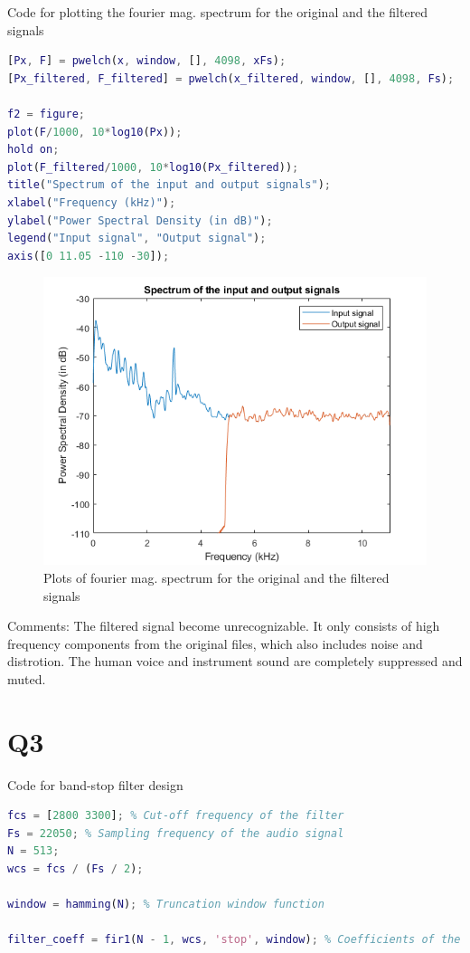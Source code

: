 \documentclass{article}
\begin{document}
Code for plotting the fourier mag. spectrum for the original and the filtered signals
\begin{lstlisting}[language=Matlab]
% Power Spectral Density of the input signal and output signal
[Px, F] = pwelch(x, window, [], 4098, xFs);
[Px_filtered, F_filtered] = pwelch(x_filtered, window, [], 4098, Fs);

f2 = figure;
plot(F/1000, 10*log10(Px));
hold on;
plot(F_filtered/1000, 10*log10(Px_filtered));
title("Spectrum of the input and output signals");
xlabel("Frequency (kHz)");
ylabel("Power Spectral Density (in dB)");
legend("Input signal", "Output signal");
axis([0 11.05 -110 -30]);
\end{lstlisting}

\begin{figure}[h!]
\includegraphics[width=\textwidth]{HPFresult.png}
\caption{Plots of fourier mag. spectrum for the original and the filtered signals}
\end{figure}

Comments: The filtered signal become unrecognizable. It only consists of high frequency components from the original files, which also includes noise and distrotion. The human voice and instrument sound are completely suppressed and muted.

\section*{Q3}

Code for band-stop filter design
\begin{lstlisting}[language=Matlab]
fcs = [2800 3300]; % Cut-off frequency of the filter
Fs = 22050; % Sampling frequency of the audio signal
N = 513;
wcs = fcs / (Fs / 2);

window = hamming(N); % Truncation window function

filter_coeff = fir1(N - 1, wcs, 'stop', window); % Coefficients of the FIR filter
\end{lstlisting}
\end{document}

